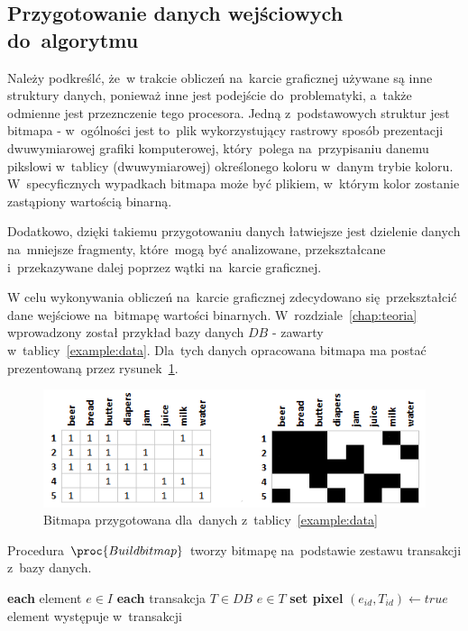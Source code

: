 \subsection{Przygotowanie danych wejściowych do~algorytmu\label{sec:dane_we}}

Należy podkreślć, że~w trakcie obliczeń na~karcie graficznej używane są inne struktury danych, ponieważ inne jest podejście do~problematyki, a~także odmienne jest przeznczenie tego procesora. Jedną z~podstawowych struktur jest bitmapa - w~ogólności jest to~plik wykorzystujący rastrowy sposób prezentacji dwuwymiarowej grafiki komputerowej, który~polega na~przypisaniu danemu pikslowi w~tablicy (dwuwymiarowej) określonego koloru w~danym trybie koloru. W~specyficznych wypadkach bitmapa może być plikiem, w~którym kolor zostanie zastąpiony wartością binarną. 

Dodatkowo, dzięki takiemu przygotowaniu danych łatwiejsze jest dzielenie danych na~mniejsze fragmenty, które~mogą być analizowane, przekształcane i~przekazywane dalej poprzez wątki na~karcie graficznej.

W celu wykonywania obliczeń na~karcie graficznej zdecydowano się~przekształcić dane wejściowe na~bitmapę wartości binarnych. W~rozdziale~\ref{chap:teoria} wprowadzony został przykład bazy danych $DB$ - zawarty w~tablicy~\ref{example:data}. Dla~tych danych opracowana bitmapa ma postać prezentowaną przez rysunek~\ref{rys:example_bitmap}.

\begin{figure}[ht]
\centering
\includegraphics{figures/05/example_bitmap.png}
\caption{Bitmapa przygotowana dla~danych z~tablicy~\ref{example:data}}\label{rys:example_bitmap}
\end{figure}

Procedura $\proc{Build bitmap}$ tworzy bitmapę na~podstawie zestawu transakcji z~bazy danych.

\begin{codebox}
		\li \For \textbf{each} element $e \in I$ 
		\li \Do
			\li \For \textbf{each} transakcja $T \in DB$
					\li \Do 
						\If $e \in T$
						\li \Then
							\textbf{set pixel} $(e_{id}, T_{id}) \gets true$\label{li:set_bitmap}\CommentSymbol element występuje w~transakcji
						\End
					\End
		\End
\end{codebox}

